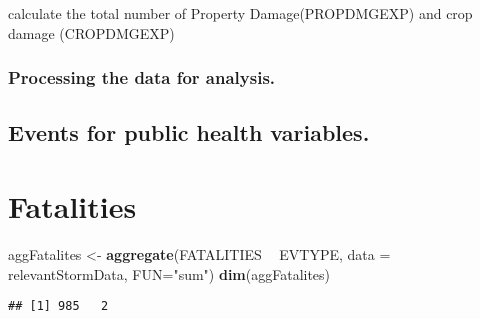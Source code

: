 \documentclass[
]{article}
\newenvironment{Shaded}{\begin{snugshade}}{\end{snugshade}}
\newcommand{\DataTypeTok}[1]{\textcolor[rgb]{0.13,0.29,0.53}{#1}}
\newcommand{\DecValTok}[1]{\textcolor[rgb]{0.00,0.00,0.81}{#1}}
\newcommand{\KeywordTok}[1]{\textcolor[rgb]{0.13,0.29,0.53}{\textbf{#1}}}
\newcommand{\NormalTok}[1]{#1}
\newcommand{\OperatorTok}[1]{\textcolor[rgb]{0.81,0.36,0.00}{\textbf{#1}}}
\newcommand{\StringTok}[1]{\textcolor[rgb]{0.31,0.60,0.02}{#1}}
\begin{document}
calculate the total number of Property Damage(PROPDMGEXP) and crop
damage (CROPDMGEXP)

\begin{Shaded}
\end{Shaded}

\hypertarget{processing-the-data-for-analysis.}{%
\subsubsection{Processing the data for
analysis.}\label{processing-the-data-for-analysis.}}

\hypertarget{events-for-public-health-variables.}{%
\subsection{Events for public health
variables.}\label{events-for-public-health-variables.}}

\hypertarget{fatalities}{%
\section{Fatalities}\label{fatalities}}

\begin{Shaded}
\begin{Highlighting}[]
\NormalTok{aggFatalites <-}\StringTok{ }\KeywordTok{aggregate}\NormalTok{(FATALITIES }\OperatorTok{~}\StringTok{ }\NormalTok{EVTYPE, }\DataTypeTok{data =}\NormalTok{ relevantStormData,  }\DataTypeTok{FUN=}\StringTok{"sum"}\NormalTok{)}
\KeywordTok{dim}\NormalTok{(aggFatalites) }
\end{Highlighting}
\end{Shaded}

\begin{verbatim}
## [1] 985   2
\end{verbatim}
\end{document}
